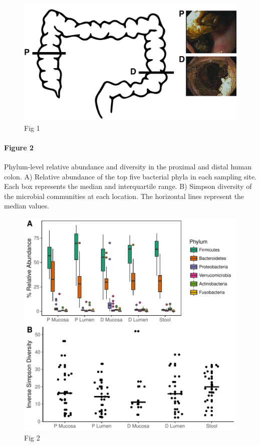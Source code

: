 \documentclass[12pt,]{article}
\let\oldparagraph\paragraph
\renewcommand{\paragraph}[1]{\oldparagraph{#1}\mbox{}}
\begin{document}
\begin{figure}[htbp]
\centering
\includegraphics{../submission/fig1.jpg}
\caption{Fig 1}
\end{figure}

\newpage

\paragraph{Figure 2}\label{figure-2}

Phylum-level relative abundance and diversity in the proximal and distal
human colon. A) Relative abundance of the top five bacterial phyla in
each sampling site. Each box represents the median and interquartile
range. B) Simpson diversity of the microbial communities at each
location. The horizontal lines represent the median values.

\begin{figure}[htbp]
\centering
\includegraphics{../submission/figure_2.pdf}
\caption{Fig 2}
\end{figure}
\end{document}
